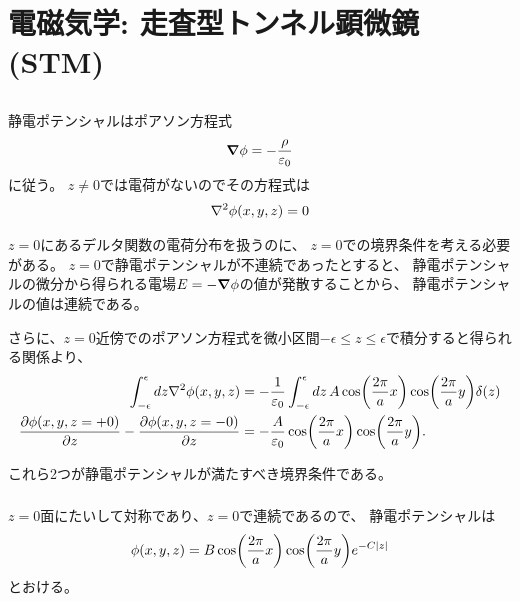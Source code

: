 \documentclass[../../master.tex]{subfiles}
\begin{document}
\chapter{電磁気学: 走査型トンネル顕微鏡(STM)}
\section{}
\subsection{}
静電ポテンシャルはポアソン方程式
\begin{equation}\begin{aligned}[b]
    \grad{\phi} = -\frac{\rho}{\varepsilon_0}
\end{aligned}\end{equation}
に従う。
\(z\neq0\)では電荷がないのでその方程式は
\begin{equation}\begin{aligned}[b]
    \laplacian{\phi(x,y,z)} = 0
\end{aligned}\end{equation}

\(z=0\)にあるデルタ関数の電荷分布を扱うのに、
\(z=0\)での境界条件を考える必要がある。
\(z=0\)で静電ポテンシャルが不連続であったとすると、
静電ポテンシャルの微分から得られる電場\(E=-\grad \phi\)の値が発散することから、
静電ポテンシャルの値は連続である。

さらに、\(z=0\)近傍でのポアソン方程式を微小区間\(-\epsilon\le z\le \epsilon\)で積分すると得られる関係より、
\begin{equation}\begin{aligned}[b]
    \int_{-\epsilon}^{\epsilon}dz \laplacian{\phi(x,y,z)}
        &= -\frac{1}{\varepsilon_0}\int_{-\epsilon}^{\epsilon}dz\, A\cos(\frac{2\pi}{a}x)\cos(\frac{2\pi}{a}y)\delta(z)\\
    \pdv{\phi(x,y,z=+0)}{z}-\pdv{\phi(x,y,z=-0)}{z}
        &= -\frac{A}{\varepsilon_0}\cos(\frac{2\pi}{a}x)\cos(\frac{2\pi}{a}y).
\end{aligned}\end{equation}

これら2つが静電ポテンシャルが満たすべき境界条件である。

\subsection{}
\(z=0\)面にたいして対称であり、\(z=0\)で連続であるので、
静電ポテンシャルは
\begin{equation}\begin{aligned}[b]
    \phi(x,y,z) = B\cos(\frac{2\pi}{a}x)\cos(\frac{2\pi}{a}y)e^{-C\abs{z}}
\end{aligned}\end{equation}
とおける。
\end{document}
